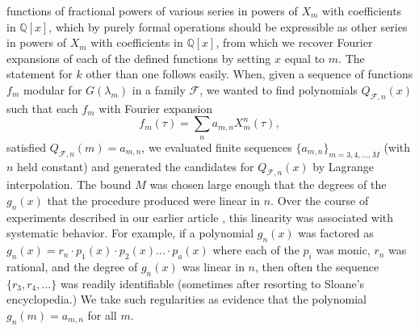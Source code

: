 \documentclass{article}
\begin{document}
functions of fractional powers
of various series in
powers of $X_m$ with coefficients
in $\mathbb{Q}[x]$,
which by purely formal operations
should be expressible as other
series in powers of $X_m$ with
coefficients in $\mathbb{Q}[x]$,
from which we 
recover Fourier expansions of 
each of the defined functions
by setting $x$ equal to $m$.
The statement for $k$ other
than one follows easily.
\newline \newline \noindent
When, given  a sequence of functions
$f_m$ modular for  $G(\lambda_m)$ 
in a family $\mathcal{F}$,
we wanted to find polynomials
$Q_{\mathcal{F},n}(x)$
such that each $f_m$
with Fourier expansion
$$
f_m(\tau) = \sum_n  a_{m,n} X_m^n(\tau),
$$
satisfied $Q_{\mathcal{F},n}(m) = a_{m,n}$,
we evaluated
finite sequences
$\{a_{m,n}\}_{m = 3, 4, ...,M}$
 (with $n$ held constant)
and generated the candidates
for $Q_{\mathcal{F},n}(x)$
by Lagrange interpolation.
The bound $M$ was 
chosen large enough that
the degrees of the $g_n(x)$
that the procedure produced were
linear in $n$.
Over the
course of experiments described in
our earlier article \cite{interpolating}, 
this linearity 
was associated with systematic behavior.
For example, if a polynomial $g_n(x)$
was factored as 
$g_n(x) = 
r_n\cdot p_1(x) \cdot p_2(x)...\cdot p_a(x)$
where each of the $p_i$ was monic, $r_n$
was rational, and the degree of $g_n(x)$
was linear in $n$, then often the sequence
$\{r_3, r_4, ...\}$ was readily identifiable
(sometimes after resorting to Sloane's
encyclopedia.) We take such regularities
as evidence that the polynomial $g_n(m) =
a_{m,n}$ for all $m$.
\end{document}

